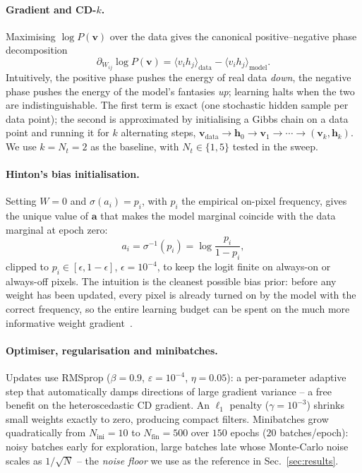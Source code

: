 \documentclass[10pt,twocolumn,a4paper]{article}
\begin{document}
\paragraph{Gradient and CD-$k$.}
Maximising $\log P(\bm{v})$ over the data gives the canonical
positive--negative phase decomposition
\begin{equation}
\partial_{W_{ij}}\!\log P(\bm{v})=\langle v_i h_j\rangle_{\!\text{data}} -\langle v_i h_j\rangle_{\!\text{model}}.
 \label{eq:grad}
\end{equation}
Intuitively, the positive phase pushes the energy of real data
\emph{down}, the negative phase pushes the energy of the model's
fantasies \emph{up}; learning halts when the two are
indistinguishable. The first term is exact (one stochastic hidden
sample per data point); the second is approximated by initialising a
Gibbs chain on a data point and running it for $k$ alternating steps,
$\bm{v}_{\text{data}}\!\to\!\bm{h}_0\!\to\!\bm{v}_1\!\to\!\cdots\!\to(\bm{v}_k,\bm{h}_k)$.
We use $k\!=\!N_t\!=\!2$ as the baseline, with $N_t\!\in\!\{1,5\}$
tested in the sweep.

\paragraph{Hinton's bias initialisation.}
Setting $W\!=\!0$ and $\sigma(a_i)\!=\!p_i$, with $p_i$ the empirical
on-pixel frequency, gives the unique value of $\bm{a}$ that makes the
model marginal coincide with the data marginal at epoch zero:
\begin{equation}
a_i=\sigma^{-1}(p_i)=\log\frac{p_i}{1-p_i},
 \label{eq:hinton}
\end{equation}
clipped to $p_i\!\in\![\epsilon,1-\epsilon]$, $\epsilon\!=\!10^{-4}$,
to keep the logit finite on always-on or always-off pixels. The
intuition is the cleanest possible bias prior: before any weight has
been updated, every pixel is already turned on by the model with the
correct frequency, so the entire learning budget can be spent on the
much more informative weight gradient~\cite{hinton2012}.

\paragraph{Optimiser, regularisation and minibatches.}
Updates use RMSprop ($\beta\!=\!0.9$, $\varepsilon\!=\!10^{-4}$,
$\eta\!=\!0.05$): a per-parameter adaptive step that automatically
damps directions of large gradient variance -- a free benefit on the
heteroscedastic CD gradient. An $\ell_1$ penalty ($\gamma\!=\!10^{-3}$)
shrinks small weights exactly to zero, producing compact filters.
Minibatches grow quadratically from $N_{\text{ini}}\!=\!10$ to
$N_{\text{fin}}\!=\!500$ over $150$ epochs ($20$ batches/epoch): noisy
batches early for exploration, large batches late whose Monte-Carlo
noise scales as $1/\sqrt{N}$ -- the \emph{noise floor} we use as the
reference in Sec.~\ref{sec:results}.
\end{document}
